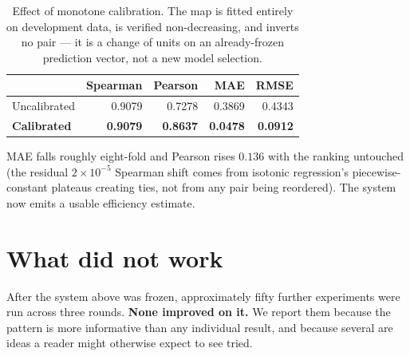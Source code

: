 \documentclass[11pt]{article}
\begin{document}
\begin{table}[H]
\centering
\caption{Effect of monotone calibration. The map is fitted entirely on development
data, is verified non-decreasing, and inverts no pair --- it is a change of units on an
already-frozen prediction vector, not a new model selection.}
\label{tab:calib}
\begin{tabular}{lrrrr}
\toprule
 & Spearman & Pearson & MAE & RMSE \\
\midrule
Uncalibrated & 0.9079 & 0.7278 & 0.3869 & 0.4343 \\
\textbf{Calibrated} & \textbf{0.9079} & \textbf{0.8637} & \textbf{0.0478} & \textbf{0.0912} \\
\bottomrule
\end{tabular}
\end{table}

MAE falls roughly eight-fold and Pearson rises $0.136$ with the ranking untouched (the
residual $2\times10^{-5}$ Spearman shift comes from isotonic regression's
piecewise-constant plateaus creating ties, not from any pair being reordered). The
system now emits a usable efficiency estimate.

\section{What did not work}
\label{sec:negatives}

After the system above was frozen, approximately fifty further experiments were run
across three rounds. \textbf{None improved on it.} We report them because the pattern
is more informative than any individual result, and because several are ideas a reader
might otherwise expect to see tried.
\end{document}
